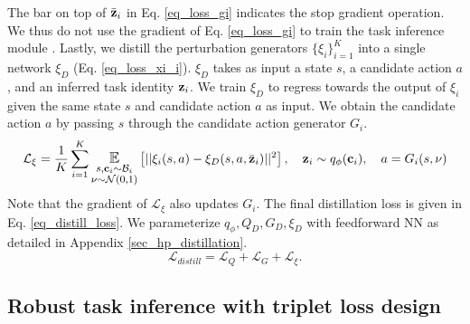 The bar on top of $\bar{\bf z}_i$ in Eq. \ref{eq_loss_gi} indicates the stop gradient operation. We thus do not use the gradient of Eq. \ref{eq_loss_gi} to train the task inference module \cite{rakelly2019efficient}. Lastly, we distill the perturbation generators $\{\xi_i\}^K_{i=1}$ into a single network $\xi_D$ (Eq. \ref{eq_loss_xi_i}).
$\xi_D$ takes as input a state $s$, a candidate action $a$, and an inferred task identity ${\bf z}_i$. We train $\xi_D$ to regress towards the output of $\xi_i$ given the same state $s$ and candidate action $a$ as input.
We obtain the candidate action $a$ by passing $s$ through the candidate action generator $G_i$.
\begin{equation}\label{eq_loss_xi_i}
    \mathcal{L}_\xi = \frac{1}{K} \sum_{i=1}^{K} \mathlarger{\underset{\substack{s, {\bf c}_{i} \sim \mathcal{B}_i \\ \nu \sim \mathcal{N}(0,1)} }{\mathbb{E}}}\left[ || \xi_i(s, a) - \xi_D(s, a, \bar{\bf z}_i) || ^ 2 \right], \quad {\bf z}_i \sim q_\phi({\bf c}_{i}), \quad a = G_i(s, \nu)
\end{equation}
Note that the gradient of $\mathcal{L}_\xi$ also updates $G_i$. The final distillation loss is given in Eq. \ref{eq_distill_loss}. We parameterize $q_\phi, Q_D, G_D, \xi_D$ with feedforward NN as detailed in Appendix \ref{sec_hp_distillation}.
\begin{equation}\label{eq_distill_loss}
    \mathcal{L}_{distill} = \mathcal{L}_Q + \mathcal{L}_G + \mathcal{L}_\xi.
\end{equation}

\subsection{Robust task inference with triplet loss design}\label{sec_algo_triplet}

